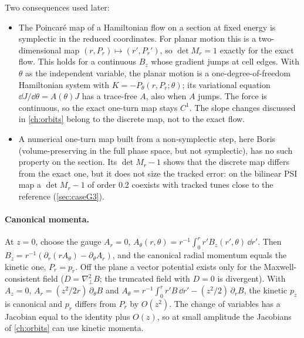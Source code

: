 Two consequences used later:
\begin{itemize}
\item The Poincar\'e map of a Hamiltonian flow on a section at fixed energy is symplectic in the reduced coordinates.
For planar motion this is a two-dimensional map $(r,P_r)\mapsto(r',P_r')$, so $\det M_r = 1$ exactly for the exact
flow.
This holds for a continuous $B_z$ whose gradient jumps at cell edges.
With $\theta$ as the independent variable, the planar motion is a one-degree-of-freedom Hamiltonian system with
$K = -P_\theta(r,P_r;\theta)$; its variational equation $\dd J/\dd\theta = A(\theta)J$ has a trace-free $A$, also when $A$
jumps.
The force is continuous, so the exact one-turn map stays $C^1$.
The slope changes discussed in \cref{ch:orbits} belong to the discrete map, not to the exact flow.
\item A numerical one-turn map built from a non-symplectic step, here Boris (volume-preserving in the full phase space,
but not symplectic), has no such property on the section.
Its $\det M_r - 1$ shows that the discrete map differs from the exact one, but it does not size the tracked error: on the bilinear PSI map a $\det M_r - 1$ of order 0.2 coexists with tracked tunes close to the reference (\cref{sec:caseG3}).
\end{itemize}

\paragraph{Canonical momenta.}
At $z=0$, choose the gauge $A_r = 0$, $A_\theta(r,\theta) = r^{-1}\int_0^r r'B_z(r',\theta)\,\dd r'$.
Then $B_z = r^{-1}(\partial_r(rA_\theta) - \partial_\theta A_r)$, and the canonical radial momentum equals the kinetic
one, $P_r = p_r$.
Off the plane a vector potential exists only for the Maxwell-consistent field ($D = \nabla_\perp^2B$; the truncated field
with $D=0$ is divergent).
With $A_z = 0$, $A_r = (z^2/2r)\,\partial_\theta B$ and $A_\theta = r^{-1}\int_0^r r'B\,\dd r' - (z^2/2)\,\partial_rB$, the kinetic
$p_z$ is canonical and $p_r$ differs from $P_r$ by $O(z^2)$.
The change of variables has a Jacobian equal to the identity plus $O(z)$, so at small amplitude the Jacobians of
\cref{ch:orbits} can use kinetic momenta.
